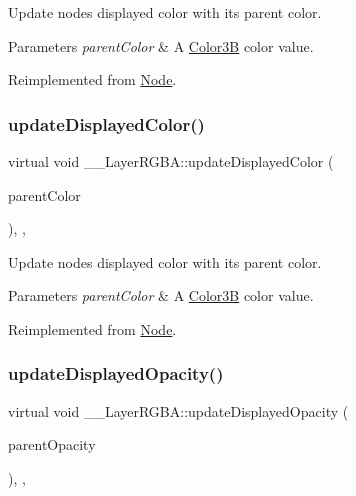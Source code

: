 Update node\textquotesingle{}s displayed color with its parent color. 
\begin{DoxyParams}{Parameters}
{\em parent\+Color} & A \hyperlink{structColor3B}{Color3B} color value. \\
\hline
\end{DoxyParams}


Reimplemented from \hyperlink{classNode_ac733bae7b9590f8da746cbc3d1337a2f}{Node}.

\mbox{\label{class____LayerRGBA_aa0406779f58fc6586f51129bee7aed36}} 
\subsubsection{\texorpdfstring{update\+Displayed\+Color()}{updateDisplayedColor()}\hspace{0.1cm}{\footnotesize\ttfamily [2/2]}}
{\footnotesize\ttfamily virtual void \+\_\+\+\_\+\+Layer\+R\+G\+B\+A\+::update\+Displayed\+Color (\begin{DoxyParamCaption}\item[{const \hyperlink{structColor3B}{Color3B} \&}]{parent\+Color }\end{DoxyParamCaption})\hspace{0.3cm}{\ttfamily [inline]}, {\ttfamily [override]}, {\ttfamily [virtual]}}

Update node\textquotesingle{}s displayed color with its parent color. 
\begin{DoxyParams}{Parameters}
{\em parent\+Color} & A \hyperlink{structColor3B}{Color3B} color value. \\
\hline
\end{DoxyParams}


Reimplemented from \hyperlink{classNode_ac733bae7b9590f8da746cbc3d1337a2f}{Node}.

\mbox{\label{class____LayerRGBA_a53e78a19fb9780fec84476f1bce1d3f6}} 
\subsubsection{\texorpdfstring{update\+Displayed\+Opacity()}{updateDisplayedOpacity()}\hspace{0.1cm}{\footnotesize\ttfamily [1/2]}}
{\footnotesize\ttfamily virtual void \+\_\+\+\_\+\+Layer\+R\+G\+B\+A\+::update\+Displayed\+Opacity (\begin{DoxyParamCaption}\item[{G\+Lubyte}]{parent\+Opacity }\end{DoxyParamCaption})\hspace{0.3cm}{\ttfamily [inline]}, {\ttfamily [override]}, {\ttfamily [virtual]}}

